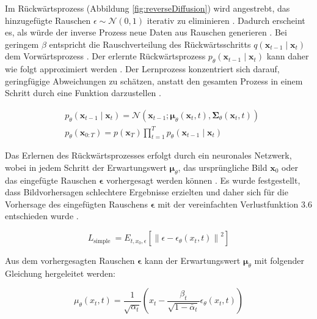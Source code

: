 \documentclass[
  a4paper,  %
  twoside,  %
  bibliography=totoc,
  headsepline,
  cleardoublepage=empty,
  parskip=half,
  draft=false
]{scrbook}
\begin{document}
Im Rückwärtsprozess (Abbildung \ref{fig:reverseDiffusion}) wird angestrebt, das hinzugefügte Rauschen $\epsilon \sim \mathcal{N}(0,1)$ iterativ zu eliminieren \cite{machine_learning_at_berkeley_diffusion_2022}. Dadurch erscheint es, als würde der inverse Prozess neue Daten aus Rauschen generieren \cite{machine_learning_at_berkeley_diffusion_2022}. Bei geringem $\beta$ entspricht die Rauschverteilung des Rückwärtsschritts \( q\left(\mathbf{x}_{t-1} \mid \mathbf{x}_t\right) \) dem Vorwärtsprozess \cite{sohl-dickstein_deep_2015}. Der erlernte Rückwärtsprozess \( p_\theta\left(\mathbf{x}_{t-1} \mid \mathbf{x}_t\right) \) kann daher wie folgt approximiert werden \cite{ho_denoising_2020, machine_learning_at_berkeley_diffusion_2022, nichol_improved_2021}. Der Lernprozess konzentriert sich darauf, geringfügige Abweichungen zu schätzen, anstatt den gesamten Prozess in einem Schritt durch eine Funktion darzustellen \cite{sohl-dickstein_deep_2015}.


\begin{align}
& p_\theta\left(\mathbf{x}_{t-1} \mid \mathbf{x}_t\right)=\mathcal{N}\left(\mathbf{x}_{t-1} ; \boldsymbol{\mu}_\theta\left(\mathbf{x}_t, t\right), \boldsymbol{\Sigma}_\theta\left(\mathbf{x}_t, t\right)\right)\\
& p_\theta\left(\mathbf{x}_{0: T}\right)=p\left(\mathbf{x}_T\right) \prod_{t=1}^T p_\theta\left(\mathbf{x}_{t-1} \mid \mathbf{x}_t\right)
\end{align}

Das Erlernen des Rückwärtsprozesses erfolgt durch ein neuronales Netzwerk, wobei in jedem Schritt der Erwartungswert $\boldsymbol{\mu}_\theta$, das ursprüngliche Bild $\boldsymbol{x}_0$ oder das eingefügte Rauschen $\boldsymbol{\epsilon}$ vorhergesagt werden können \cite{ho_denoising_2020, nichol_improved_2021}. Es wurde festgestellt, dass Bildvorhersagen schlechtere Ergebnisse erzielten und daher sich für die Vorhersage des eingefügten Rauschens $\boldsymbol{\epsilon}$ mit der vereinfachten Verlustfunktion 3.6 entschieden wurde \cite{ho_denoising_2020}.

\begin{equation}
    L_{\text {simple }}=E_{t, x_0, \epsilon}\left[\left\|\epsilon-\epsilon_\theta\left(x_t, t\right)\right\|^2\right]
\end{equation}

Aus dem vorhergesagten Rauschen $\boldsymbol{\epsilon}$ kann der Erwartungswert $\boldsymbol{\mu}_\theta$ mit folgender Gleichung hergeleitet werden:

\begin{equation}
    \mu_\theta\left(x_t, t\right)=\frac{1}{\sqrt{\alpha_t}}\left(x_t-\frac{\beta_t}{\sqrt{1-\bar{\alpha}_t}} \epsilon_\theta\left(x_t, t\right)\right)
\end{equation}
\end{document}
